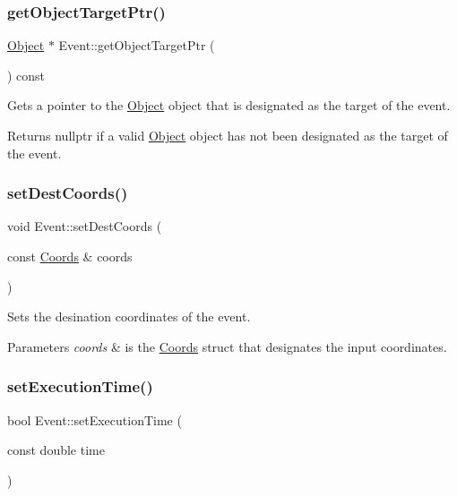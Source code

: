 \subsubsection{\texorpdfstring{get\+Object\+Target\+Ptr()}{getObjectTargetPtr()}}
{\footnotesize\ttfamily \hyperlink{class_object}{Object} $\ast$ Event\+::get\+Object\+Target\+Ptr (\begin{DoxyParamCaption}{ }\end{DoxyParamCaption}) const}



Gets a pointer to the \hyperlink{class_object}{Object} object that is designated as the target of the event. 

\begin{DoxyReturn}{Returns}
nullptr if a valid \hyperlink{class_object}{Object} object has not been designated as the target of the event. 
\end{DoxyReturn}
\mbox{\label{class_event_a166ae40f2bf26c1e08097697ca76c884}} 
\subsubsection{\texorpdfstring{set\+Dest\+Coords()}{setDestCoords()}}
{\footnotesize\ttfamily void Event\+::set\+Dest\+Coords (\begin{DoxyParamCaption}\item[{const \hyperlink{struct_coords}{Coords} \&}]{coords }\end{DoxyParamCaption})}



Sets the desination coordinates of the event. 


\begin{DoxyParams}{Parameters}
{\em coords} & is the \hyperlink{struct_coords}{Coords} struct that designates the input coordinates. \\
\hline
\end{DoxyParams}
\mbox{\label{class_event_af4282af20bd5b3940ba75c23e6032f18}} 
\subsubsection{\texorpdfstring{set\+Execution\+Time()}{setExecutionTime()}}
{\footnotesize\ttfamily bool Event\+::set\+Execution\+Time (\begin{DoxyParamCaption}\item[{const double}]{time }\end{DoxyParamCaption})}



